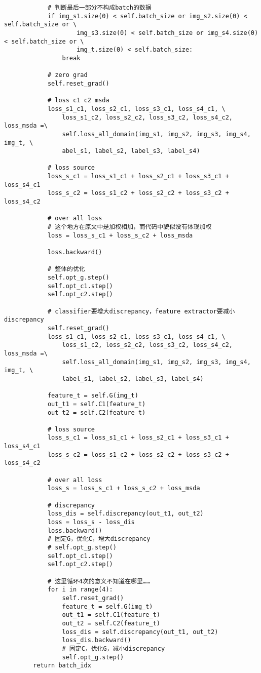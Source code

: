 \documentclass[UTF8]{ctexart}
\begin{document}
\begin{verbatim}
            # 判断最后一部分不构成batch的数据
            if img_s1.size(0) < self.batch_size or img_s2.size(0) < self.batch_size or \
                    img_s3.size(0) < self.batch_size or img_s4.size(0) < self.batch_size or \
                    img_t.size(0) < self.batch_size:
                break

            # zero grad
            self.reset_grad()

            # loss c1 c2 msda
            loss_s1_c1, loss_s2_c1, loss_s3_c1, loss_s4_c1, \
                loss_s1_c2, loss_s2_c2, loss_s3_c2, loss_s4_c2, loss_msda =\
                self.loss_all_domain(img_s1, img_s2, img_s3, img_s4, img_t, \
                abel_s1, label_s2, label_s3, label_s4)

            # loss source
            loss_s_c1 = loss_s1_c1 + loss_s2_c1 + loss_s3_c1 + loss_s4_c1
            loss_s_c2 = loss_s1_c2 + loss_s2_c2 + loss_s3_c2 + loss_s4_c2

            # over all loss
            # 这个地方在原文中是加权相加，而代码中貌似没有体现加权
            loss = loss_s_c1 + loss_s_c2 + loss_msda

            loss.backward()
            
            # 整体的优化
            self.opt_g.step()
            self.opt_c1.step()
            self.opt_c2.step()

            # classifier要增大discrepancy，feature extractor要减小discrepancy
            self.reset_grad()
            loss_s1_c1, loss_s2_c1, loss_s3_c1, loss_s4_c1, \
                loss_s1_c2, loss_s2_c2, loss_s3_c2, loss_s4_c2, loss_msda =\
                self.loss_all_domain(img_s1, img_s2, img_s3, img_s4, img_t, \
                label_s1, label_s2, label_s3, label_s4)

            feature_t = self.G(img_t)
            out_t1 = self.C1(feature_t)
            out_t2 = self.C2(feature_t)

            # loss source
            loss_s_c1 = loss_s1_c1 + loss_s2_c1 + loss_s3_c1 + loss_s4_c1
            loss_s_c2 = loss_s1_c2 + loss_s2_c2 + loss_s3_c2 + loss_s4_c2

            # over all loss
            loss_s = loss_s_c1 + loss_s_c2 + loss_msda

            # discrepancy
            loss_dis = self.discrepancy(out_t1, out_t2)
            loss = loss_s - loss_dis
            loss.backward()
            # 固定G，优化C，增大discrepancy
            # self.opt_g.step()
            self.opt_c1.step()
            self.opt_c2.step()

            # 这里循环4次的意义不知道在哪里……
            for i in range(4):
                self.reset_grad()
                feature_t = self.G(img_t)
                out_t1 = self.C1(feature_t)
                out_t2 = self.C2(feature_t)
                loss_dis = self.discrepancy(out_t1, out_t2)
                loss_dis.backward()
                # 固定C，优化G，减小discrepancy
                self.opt_g.step()
        return batch_idx
                \end{verbatim}
\end{document}
